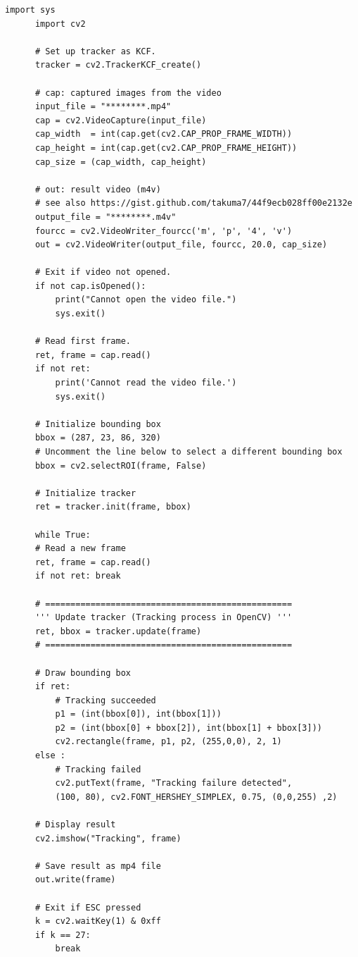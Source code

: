 \documentclass[11pt,a4j]{jarticle}
\begin{document}
    \begin{lstlisting}[basicstyle=\ttfamily\footnotesize, frame=single]
      import sys
      import cv2

      # Set up tracker as KCF.
      tracker = cv2.TrackerKCF_create()

      # cap: captured images from the video
      input_file = "********.mp4"
      cap = cv2.VideoCapture(input_file)
      cap_width  = int(cap.get(cv2.CAP_PROP_FRAME_WIDTH))
      cap_height = int(cap.get(cv2.CAP_PROP_FRAME_HEIGHT))
      cap_size = (cap_width, cap_height)
  
      # out: result video (m4v)
      # see also https://gist.github.com/takuma7/44f9ecb028ff00e2132e
      output_file = "********.m4v"
      fourcc = cv2.VideoWriter_fourcc('m', 'p', '4', 'v')  
      out = cv2.VideoWriter(output_file, fourcc, 20.0, cap_size)
    
      # Exit if video not opened.
      if not cap.isOpened():
          print("Cannot open the video file.")
          sys.exit()
    
      # Read first frame.
      ret, frame = cap.read()
      if not ret:
          print('Cannot read the video file.')
          sys.exit()
        
      # Initialize bounding box
      bbox = (287, 23, 86, 320)
      # Uncomment the line below to select a different bounding box
      bbox = cv2.selectROI(frame, False)
    
      # Initialize tracker
      ret = tracker.init(frame, bbox)

      while True:
      # Read a new frame
      ret, frame = cap.read()
      if not ret: break

      # =================================================
      ''' Update tracker (Tracking process in OpenCV) '''
      ret, bbox = tracker.update(frame) 
      # =================================================

      # Draw bounding box
      if ret:
          # Tracking succeeded
          p1 = (int(bbox[0]), int(bbox[1]))
          p2 = (int(bbox[0] + bbox[2]), int(bbox[1] + bbox[3]))
          cv2.rectangle(frame, p1, p2, (255,0,0), 2, 1)
      else :
          # Tracking failed
          cv2.putText(frame, "Tracking failure detected", 
          (100, 80), cv2.FONT_HERSHEY_SIMPLEX, 0.75, (0,0,255) ,2)

      # Display result
      cv2.imshow("Tracking", frame)

      # Save result as mp4 file
      out.write(frame)

      # Exit if ESC pressed
      k = cv2.waitKey(1) & 0xff
      if k == 27:
          break
    \end{lstlisting}
\end{document}
